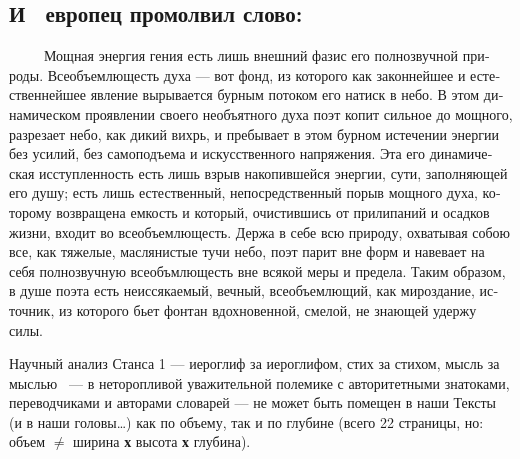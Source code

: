 \documentclass[a4paper]{article}
\begin{document}
\subsection[И \ европец промолвил слово:]{И \ европец промолвил слово:}
{
\foreignlanguage{russian}{\ \ \ \ \ Мощная энергия гения есть лишь внешний фазис его полнозвучной природы.
Всеобъемлющесть духа — вот фонд, из которого как законнейшее и естественнейшее явление вырывается бурным потоком его
натиск в небо. В этом динамическом проявлении своего необъятного духа поэт {\textquotedbl}копит сильное до
мощного{\textquotedbl}, {\textquotedbl}разрезает{\textquotedbl} небо, как дикий вихрь, и пребывает в этом бурном
истечении энергии без усилий, без самоподъема и искусственного напряжения. Эта его динамическая исступленность есть
лишь взрыв накопившейся энергии, {\textquotedbl}сути{\textquotedbl}, заполняющей его душу; есть лишь естественный,
непосредственный порыв мощного духа, которому {\textquotedbl}возвращена емкость{\textquotedbl} и который, очистившись
от прилипаний и осадков жизни, {\textquotedbl}входит во всеобъемлющесть{\textquotedbl}. {\textquotedbl}Держа в себе всю
природу{\textquotedbl}, охватывая собою все, как тяжелые, {\textquotedbl}маслянистые{\textquotedbl} тучи небо, поэт
{\textquotedbl}парит вне форм{\textquotedbl} и навевает на себя полнозвучную
{\textquotedbl}всеобъмлющесть{\textquotedbl} вне всякой меры и предела. Таким образом, в душе поэта есть неиссякаемый,
вечный, всеобъемлющий, как мироздание, источник, из которого бьет фонтан вдохновенной, смелой, не знающей удержу
силы.}}


\bigskip

{
\foreignlanguage{russian}{Научный анализ Станса 1 — иероглиф за иероглифом, стих за стихом, мысль за мыслью \ — в
неторопливой уважительной полемике с авторитетными знатоками, переводчиками и авторами словарей — не может быть помещен
в наши {\textquotedbl}Тексты{\textquotedbl} (и в наши головы…) как по объему, так и по глубине \newline
(всего 22 страницы, но: объем }\foreignlanguage{russian}{\textbf{${\neq}$}}\foreignlanguage{russian}{ ширина
}\foreignlanguage{russian}{\textbf{х}}\foreignlanguage{russian}{ высота
}\foreignlanguage{russian}{\textbf{х}}\foreignlanguage{russian}{ глубина). }}


\bigskip
\end{document}
